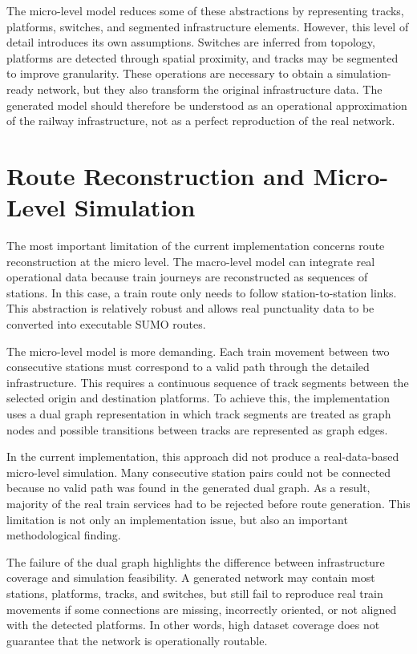 The micro-level model reduces some of these abstractions by representing tracks, platforms, switches, and segmented 
infrastructure elements. However, this level of detail introduces its own assumptions. Switches are inferred from topology, 
platforms are detected through spatial proximity, and tracks may be segmented to improve granularity. These operations are 
necessary to obtain a simulation-ready network, but they also transform the original infrastructure data. The generated 
model should therefore be understood as an operational approximation of the railway infrastructure, not as a perfect 
reproduction of the real network.

\newpage

\section{Route Reconstruction and Micro-Level Simulation}
The most important limitation of the current implementation concerns route reconstruction at the micro level. The 
macro-level model can integrate real operational data because train journeys are reconstructed as sequences of stations. In 
this case, a train route only needs to follow station-to-station links. This abstraction is relatively robust and allows 
real punctuality data to be converted into executable SUMO routes.

The micro-level model is more demanding. Each train movement between two consecutive stations must correspond to a valid 
path through the detailed infrastructure. This requires a continuous sequence of track segments between the selected 
origin and destination platforms. To achieve this, the implementation uses a dual graph representation in which track 
segments are treated as graph nodes and possible transitions between tracks are represented as graph edges.

In the current implementation, this approach did not produce a real-data-based micro-level simulation. Many 
consecutive station pairs could not be connected because no valid path was found in the generated dual graph. As a result, 
majority of the real train services had to be rejected before route generation. This limitation is not only an 
implementation issue, but also an important methodological finding.

The failure of the dual graph highlights the difference between infrastructure coverage and simulation feasibility. A 
generated network may contain most stations, platforms, tracks, and switches, but still fail to reproduce real train 
movements if some connections are missing, incorrectly oriented, or not aligned with the detected platforms. In other 
words, high dataset coverage does not guarantee that the network is operationally routable.

